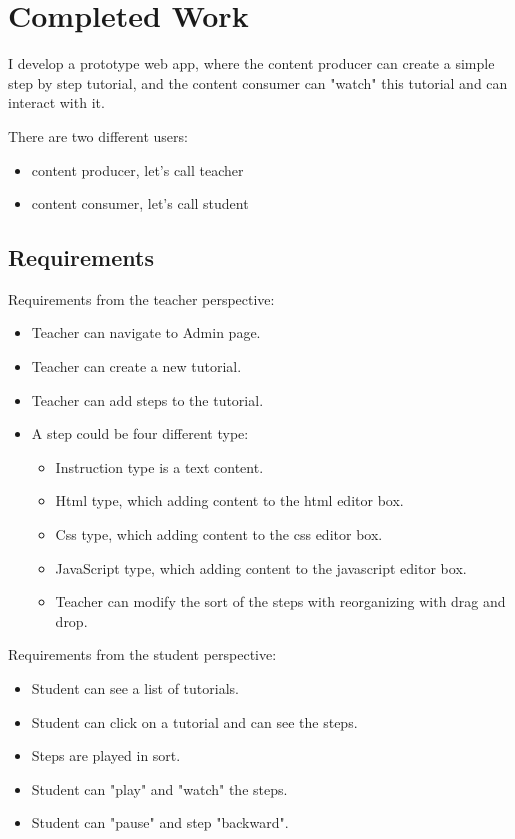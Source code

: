 \chapter{Completed Work}

I develop a prototype web app, where the content producer can create a simple step by step tutorial, and the content consumer can "watch" this tutorial and can interact with it.

There are two different users:
\begin{itemize}
\item content producer, let's call teacher
\item content consumer, let's call student
\end{itemize}

\section{Requirements}

Requirements from the teacher perspective:
\begin{itemize}
\item Teacher can navigate to Admin page.
\item Teacher can create a new tutorial.
\item Teacher can add steps to the tutorial.
\item A step could be four different type:
\begin{itemize}
\item Instruction type is a text content.
\item Html type, which adding content to the html editor box.
\item Css type, which adding content to the css editor box.
\item JavaScript type, which adding content to the javascript editor box.
\item Teacher can modify the sort of the steps with reorganizing with drag and drop.
\end{itemize}
\end{itemize}

Requirements from the student perspective:
\begin{itemize}
\item Student can see a list of tutorials.
\item Student can click on a tutorial and can see the steps.
\item Steps are played in sort.
\item Student can "play" and "watch" the steps.
\item Student can "pause" and step "backward".
\end{itemize}

